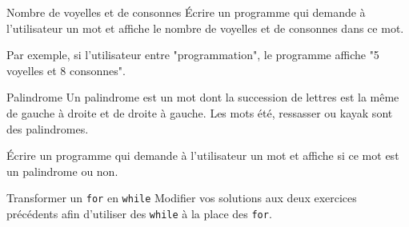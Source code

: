 \documentclass[a4paper,11pt]{style-esi/td}
\begin{document}
	\begin{Exercice}{Nombre de voyelles et de consonnes}	
		\'Ecrire un programme qui demande à l'utilisateur 
		un mot et affiche le nombre de voyelles et de consonnes dans ce mot.
		
		Par exemple, si l'utilisateur entre "programmation", le programme affiche "5 voyelles et 8 consonnes".	
	\end{Exercice}


	\begin{Exercice}{Palindrome}
		Un palindrome est un mot dont la succession de lettres est la même 
		de gauche à droite et de droite à gauche. 
		Les mots été, ressasser ou kayak sont des palindromes.
		  	
		\'Ecrire un programme qui demande à l'utilisateur 
		un mot et affiche si ce mot est un palindrome ou non.
	\end{Exercice}

	\begin{Exercice}{Transformer un \texttt{for} en \texttt{while}}
		Modifier vos solutions aux deux exercices précédents afin d'utiliser des \texttt{while} à la place des \texttt{for}. 
	\end{Exercice}
\end{document}

